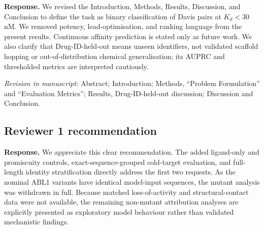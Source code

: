 \documentclass[11pt,a4paper]{article}
\newcommand{\response}{\noindent\textbf{Response.} }
\newcommand{\change}[1]{\par\smallskip\noindent\textit{Revision in manuscript:} #1\par\medskip}
\begin{document}

\response We revised the Introduction, Methods, Results, Discussion, and
Conclusion to define the task as binary classification of Davis pairs at
$K_d<30$ nM.  We removed potency, lead-optimisation, and ranking language from
the present results.  Continuous affinity prediction is stated only as future
work. We also clarify that Drug-ID-held-out means unseen identifiers, not validated
scaffold hopping or out-of-distribution chemical generalisation; its AUPRC and
thresholded metrics are interpreted cautiously.

\change{Abstract; Introduction; Methods, ``Problem Formulation'' and
``Evaluation Metrics''; Results, Drug-ID-held-out discussion; Discussion and
Conclusion.}

\subsection*{Reviewer 1 recommendation}


\response We appreciate this clear recommendation. The added ligand-only and
promiscuity controls, exact-sequence-grouped cold-target evaluation, and
full-length identity stratification directly address the first two requests. As
the nominal ABL1 variants have identical model-input sequences, the mutant
analysis was withdrawn in full. Because matched loss-of-activity and
structural-contact data were not available, the remaining non-mutant attribution
analyses are explicitly presented as exploratory model behaviour rather than
validated mechanistic findings.
\end{document}
